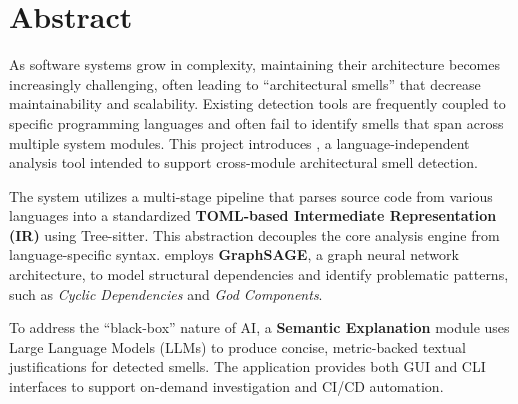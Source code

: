 \chapter*{Abstract}
\label{chap:abstract}

As software systems grow in complexity, maintaining their architecture becomes increasingly challenging,
often leading to ``architectural smells'' that decrease maintainability and scalability.
Existing detection tools are frequently coupled to specific programming languages and often fail to
identify smells that span across multiple system modules. This project introduces \textbf{\usevar{\srsNickName}}, a language-independent analysis tool intended to support cross-module architectural smell detection.

The system utilizes a multi-stage pipeline that parses source code from various languages into
a standardized \textbf{TOML-based Intermediate Representation (IR)} using Tree-sitter.
This abstraction decouples the core analysis engine from language-specific syntax.
\textbf{\usevar{\srsNickName}} employs \textbf{GraphSAGE}, a graph neural network architecture, to model structural dependencies
and identify problematic patterns, such as \textit{Cyclic Dependencies} and \textit{God Components}.

To address the ``black-box'' nature of AI, a \textbf{Semantic Explanation} module uses Large Language Models (LLMs) to produce concise, metric-backed textual justifications for detected smells. The application provides both GUI and CLI interfaces to support on-demand investigation and CI/CD automation.
